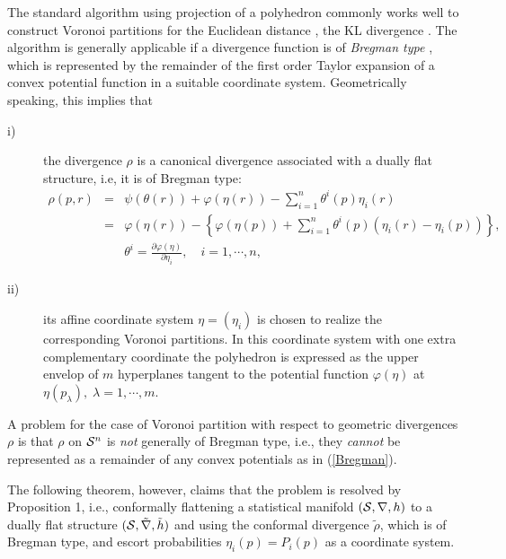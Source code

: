 \documentclass{llncs}
\begin{document}
The standard algorithm using projection of a polyhedron \cite{ES,Ed} 
commonly works well to construct Voronoi partitions for 
the Euclidean distance \cite{Ed}, 
the KL divergence \cite{OI}.
The algorithm is generally applicable 
if a divergence function is of {\it Bregman type} \cite{NBN}, 
which is represented by 
the remainder of the first order Taylor expansion of 
a convex potential function in a suitable coordinate system.
Geometrically speaking, this implies that 
\begin{description}
\item[i)] the divergence $\rho$ is a canonical divergence associated with 
a dually flat structure, i.e, it is of Bregman type: 
\begin{eqnarray}
	\rho (p,r)
	&=& \psi(\theta(r))+\varphi(\eta(r))
	-\sum_{i=1}^n \theta^i(p) \eta_i(r) \nonumber \\
	&=& \varphi(\eta(r))-\left\{ \varphi(\eta(p)) +\sum_{i=1}^n 
	\theta^i (p)\left( \eta_i(r)-\eta_i(p) \right) \right\}, 
\label{Bregman} \\
	&& \theta^i=\frac{\partial \varphi(\eta)}{\partial \eta_i}, \quad
	i=1,\cdots,n,
	\nonumber
\end{eqnarray}
\item[ii)] its affine coordinate system $\eta=(\eta_i)$ is chosen 
to realize the corresponding Voronoi partitions.
In this coordinate system with one extra complementary coordinate 
the polyhedron is expressed as the upper envelop of 
$m$ hyperplanes tangent to the potential function $\varphi(\eta)$ 
at $\eta(p_\lambda), \; \lambda=1,\cdots,m$.
\end{description}

A problem for the case of Voronoi partition with respect to 
geometric divergences $\rho$ is 
that $\rho$ on ${\cal S}^n$ is {\em not} generally of Bregman type, i.e., 
they {\em cannot} be represented 
as a remainder of any convex potentials as in (\ref{Bregman}).

The following theorem, however, claims that the problem is resolved by 
Proposition 1, i.e., conformally flattening a statistical manifold 
$({\cal S}, \nabla, h)$ 
to a dually flat structure $({\cal S}, \tilde \nabla,\tilde h)$ and 
using the conformal divergence $\tilde \rho$, which is of Bregman type, 
and escort probabilities $\eta_i(p)=P_i(p)$ as a coordinate system. 
\end{document}
